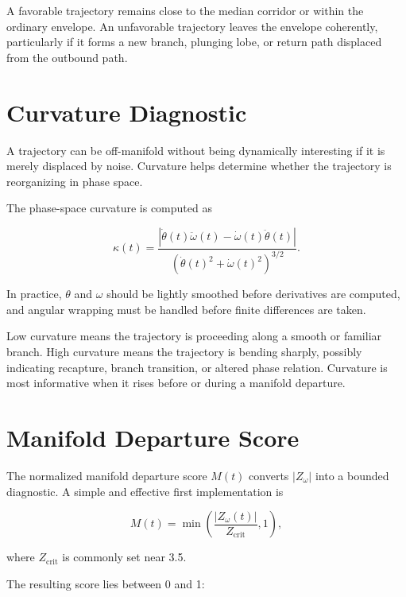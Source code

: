 \documentclass[11pt]{article}
\begin{document}
A favorable trajectory remains close to the median corridor or within the ordinary envelope. An unfavorable trajectory leaves the envelope coherently, particularly if it forms a new branch, plunging lobe, or return path displaced from the outbound path.

\section{Curvature Diagnostic}

A trajectory can be off-manifold without being dynamically interesting if it is merely displaced by noise. Curvature helps determine whether the trajectory is reorganizing in phase space.

The phase-space curvature is computed as

\begin{equation}
\kappa(t) =
\frac{\left|\dot{\theta}(t)\ddot{\omega}(t)-\dot{\omega}(t)\ddot{\theta}(t)\right|}
{\left(\dot{\theta}(t)^2+\dot{\omega}(t)^2\right)^{3/2}}.
\end{equation}

In practice, \(\theta\) and \(\omega\) should be lightly smoothed before derivatives are computed, and angular wrapping must be handled before finite differences are taken.

Low curvature means the trajectory is proceeding along a smooth or familiar branch. High curvature means the trajectory is bending sharply, possibly indicating recapture, branch transition, or altered phase relation. Curvature is most informative when it rises before or during a manifold departure.

\section{Manifold Departure Score}

The normalized manifold departure score \(M(t)\) converts \(|Z_{\omega}|\) into a bounded diagnostic. A simple and effective first implementation is

\begin{equation}
M(t) = \min\left(\frac{|Z_{\omega}(t)|}{Z_{\mathrm{crit}}},1\right),
\end{equation}

where \(Z_{\mathrm{crit}}\) is commonly set near 3.5.

The resulting score lies between 0 and 1:
\end{document}
